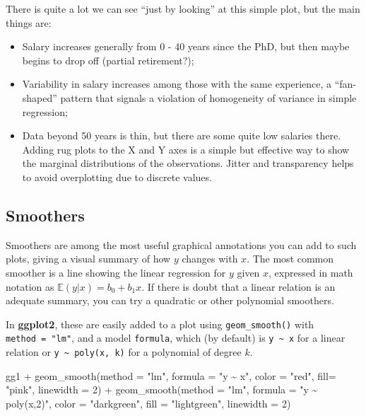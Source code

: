 \documentclass[
  letterpaper,
  10pt,
  krantz2]{krantz}
\makeatletter
\newenvironment{Shaded}{\begin{snugshade}}{\end{snugshade}}
\newcommand{\AttributeTok}[1]{\textcolor[rgb]{0.40,0.45,0.13}{#1}}
\newcommand{\DecValTok}[1]{\textcolor[rgb]{0.68,0.00,0.00}{#1}}
\newcommand{\FunctionTok}[1]{\textcolor[rgb]{0.28,0.35,0.67}{#1}}
\newcommand{\NormalTok}[1]{\textcolor[rgb]{0.00,0.23,0.31}{#1}}
\newcommand{\SpecialCharTok}[1]{\textcolor[rgb]{0.37,0.37,0.37}{#1}}
\newcommand{\StringTok}[1]{\textcolor[rgb]{0.13,0.47,0.30}{#1}}
\providecommand{\tightlist}{%
  \setlength{\itemsep}{0pt}\setlength{\parskip}{0pt}}\usepackage{longtable,booktabs,array}
\newenvironment{kframe}{%
  \medskip{}
  \setlength{\fboxsep}{.8em}
  \def\at@end@of@kframe{}%
  \ifinner\ifhmode%
  \def\at@end@of@kframe{\end{minipage}}%
  \begin{minipage}{\columnwidth}%
  \fi\fi%
  \def\FrameCommand##1{\hskip\@totalleftmargin \hskip-\fboxsep
  \colorbox{shadecolor}{##1}\hskip-\fboxsep
      \hskip-\linewidth \hskip-\@totalleftmargin \hskip\columnwidth}%
  \MakeFramed {\advance\hsize-\width
    \@totalleftmargin\z@ \linewidth\hsize
    \@setminipage}}%
{\par\unskip\endMakeFramed%
  \at@end@of@kframe}
\renewenvironment{Shaded}{\begin{kframe}}{\end{kframe}}
\makeatother
\begin{document}
There is quite a lot we can see ``just by looking'' at this simple plot,
but the main things are:

\begin{itemize}
\tightlist
\item
  Salary increases generally from 0 - 40 years since the PhD, but then
  maybe begins to drop off (partial retirement?);
\item
  Variability in salary increases among those with the same experience,
  a ``fan-shaped'' pattern that signals a violation of homogeneity of
  variance in simple regression;
\item
  Data beyond 50 years is thin, but there are some quite low salaries
  there. Adding rug plots to the X and Y axes is a simple but effective
  way to show the marginal distributions of the observations. Jitter and
  transparency helps to avoid overplotting due to discrete values.
\end{itemize}

\subsection{Smoothers}\label{smoothers}

Smoothers are among the most useful graphical annotations you can add to
such plots, giving a visual summary of how \(y\) changes with \(x\). The
most common smoother is a line showing the linear regression for \(y\)
given \(x\), expressed in math notation as
\(\mathbb{E} (y | x) = b_0 + b_1 x\). If there is doubt that a linear
relation is an adequate summary, you can try a quadratic or other
polynomial smoothers.

In \textbf{ggplot2}, these are easily added to a plot using
\texttt{geom\_smooth()} with \texttt{method\ =\ "lm"}, and a model
\texttt{formula}, which (by default) is \texttt{y\ \textasciitilde{}\ x}
for a linear relation or \texttt{y\ \textasciitilde{}\ poly(x,\ k)} for
a polynomial of degree \(k\).

\begin{Shaded}
\begin{Highlighting}[]
\NormalTok{gg1 }\SpecialCharTok{+} 
  \FunctionTok{geom\_smooth}\NormalTok{(}\AttributeTok{method =} \StringTok{"lm"}\NormalTok{, }\AttributeTok{formula =} \StringTok{"y \textasciitilde{} x"}\NormalTok{, }
              \AttributeTok{color =} \StringTok{"red"}\NormalTok{, }\AttributeTok{fill=} \StringTok{"pink"}\NormalTok{,}
              \AttributeTok{linewidth =} \DecValTok{2}\NormalTok{) }\SpecialCharTok{+}
  \FunctionTok{geom\_smooth}\NormalTok{(}\AttributeTok{method =} \StringTok{"lm"}\NormalTok{, }\AttributeTok{formula =} \StringTok{"y \textasciitilde{} poly(x,2)"}\NormalTok{, }
              \AttributeTok{color =} \StringTok{"darkgreen"}\NormalTok{, }\AttributeTok{fill =} \StringTok{"lightgreen"}\NormalTok{,}
              \AttributeTok{linewidth =} \DecValTok{2}\NormalTok{) }
\end{Highlighting}
\end{Shaded}
\end{document}
